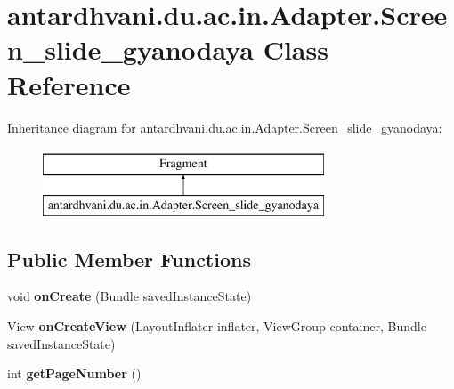 \hypertarget{classantardhvani_1_1du_1_1ac_1_1in_1_1_adapter_1_1_screen__slide__gyanodaya}{}\section{antardhvani.\+du.\+ac.\+in.\+Adapter.\+Screen\+\_\+slide\+\_\+gyanodaya Class Reference}
\label{classantardhvani_1_1du_1_1ac_1_1in_1_1_adapter_1_1_screen__slide__gyanodaya}
Inheritance diagram for antardhvani.\+du.\+ac.\+in.\+Adapter.\+Screen\+\_\+slide\+\_\+gyanodaya\+:\begin{figure}[H]
\begin{center}
\leavevmode
\includegraphics[height=2.000000cm]{classantardhvani_1_1du_1_1ac_1_1in_1_1_adapter_1_1_screen__slide__gyanodaya}
\end{center}
\end{figure}
\subsection*{Public Member Functions}
\begin{DoxyCompactItemize}
\item 
\hypertarget{classantardhvani_1_1du_1_1ac_1_1in_1_1_adapter_1_1_screen__slide__gyanodaya_a5042155188df5c76f3000367c93b6bb5}{}void {\bfseries on\+Create} (Bundle saved\+Instance\+State)\label{classantardhvani_1_1du_1_1ac_1_1in_1_1_adapter_1_1_screen__slide__gyanodaya_a5042155188df5c76f3000367c93b6bb5}

\item 
\hypertarget{classantardhvani_1_1du_1_1ac_1_1in_1_1_adapter_1_1_screen__slide__gyanodaya_a679f8002116863a053b26a388fc34fc5}{}View {\bfseries on\+Create\+View} (Layout\+Inflater inflater, View\+Group container, Bundle saved\+Instance\+State)\label{classantardhvani_1_1du_1_1ac_1_1in_1_1_adapter_1_1_screen__slide__gyanodaya_a679f8002116863a053b26a388fc34fc5}

\item 
\hypertarget{classantardhvani_1_1du_1_1ac_1_1in_1_1_adapter_1_1_screen__slide__gyanodaya_af5ab39d4b9e931934c1ebf03e10918bd}{}int {\bfseries get\+Page\+Number} ()\label{classantardhvani_1_1du_1_1ac_1_1in_1_1_adapter_1_1_screen__slide__gyanodaya_af5ab39d4b9e931934c1ebf03e10918bd}

\end{DoxyCompactItemize}

